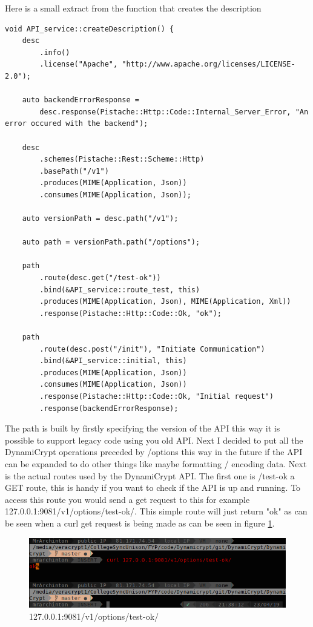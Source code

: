 Here is a small extract from the function that creates the description
\begin{lstlisting}
void API_service::createDescription() {
    desc
        .info()
        .license("Apache", "http://www.apache.org/licenses/LICENSE-2.0");

    auto backendErrorResponse =
        desc.response(Pistache::Http::Code::Internal_Server_Error, "An error occured with the backend");

    desc
        .schemes(Pistache::Rest::Scheme::Http)
        .basePath("/v1")
        .produces(MIME(Application, Json))
        .consumes(MIME(Application, Json));

    auto versionPath = desc.path("/v1");

    auto path = versionPath.path("/options");

    path
        .route(desc.get("/test-ok"))
        .bind(&API_service::route_test, this)
        .produces(MIME(Application, Json), MIME(Application, Xml))
        .response(Pistache::Http::Code::Ok, "ok");
    
    path
        .route(desc.post("/init"), "Initiate Communication")
        .bind(&API_service::initial, this)
        .produces(MIME(Application, Json))
        .consumes(MIME(Application, Json))
        .response(Pistache::Http::Code::Ok, "Initial request")
        .response(backendErrorResponse);
\end{lstlisting}
The path is built by firstly specifying the version of the API this way it is possible to support legacy code using you old API. Next I decided to put all the DynamiCrypt operations preceded by /options this way in the future if the API can be expanded to do other things like maybe formatting / encoding data. Next is the actual routes used by the DynamiCrypt API. The first one is /test-ok a GET route, this is handy if you want to check if the API is up and running. To access this route you would send a get request to this for example 127.0.0.1:9081/v1/options/test-ok/. This simple route will just return "ok" as can be seen when a curl get request is being made as can be seen in figure \ref{fig:b2}.

\begin{figure}[!h]
  \centering
      \includegraphics[width=1\textwidth]{Figures/b2.png}
  \caption[127.0.0.1:9081/v1/options/test-ok/]{127.0.0.1:9081/v1/options/test-ok/}
  \label{fig:b2}
\end{figure}
\FloatBarrier

